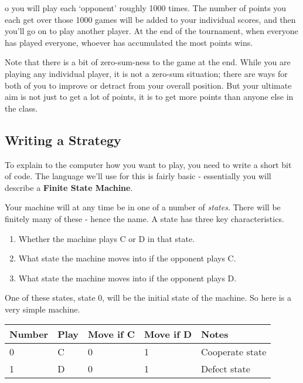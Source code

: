 \documentclass[
  11pt,
]{article}
\providecommand{\tightlist}{%
  \setlength{\itemsep}{0pt}\setlength{\parskip}{0pt}}
\begin{document}
o you will play each `opponent' roughly 1000 times. The number of points
you each get over those 1000 games will be added to your individual
scores, and then you'll go on to play another player. At the end of the
tournament, when everyone has played everyone, whoever has accumulated
the most points wins.

Note that there is a bit of zero-sum-ness to the game at the end. While
you are playing any individual player, it is not a zero-sum situation;
there are ways for both of you to improve or detract from your overall
position. But your ultimate aim is not just to get a lot of points, it
is to get more points than anyone else in the class.

\newpage

\hypertarget{writing-a-strategy}{%
\subsection{Writing a Strategy}\label{writing-a-strategy}}

To explain to the computer how you want to play, you need to write a
short bit of code. The language we'll use for this is fairly basic -
essentially you will describe a \textbf{Finite State Machine}.

Your machine will at any time be in one of a number of \emph{states}.
There will be finitely many of these - hence the name. A state has three
key characteristics.

\begin{enumerate}
\def\labelenumi{\arabic{enumi}.}
\tightlist
\item
  Whether the machine plays C or D in that state.
\item
  What state the machine moves into if the opponent plays C.
\item
  What state the machine moves into if the opponent plays D.
\end{enumerate}

One of these states, state 0, will be the initial state of the machine.
So here is a very simple machine.

\begin{longtable}[]{@{}lllll@{}}
\toprule
Number & Play & Move if C & Move if D & Notes \\
\midrule
\endhead
0 & C & 0 & 1 & Cooperate state \\
1 & D & 0 & 1 & Defect state \\
\bottomrule
\end{longtable}
\end{document}
